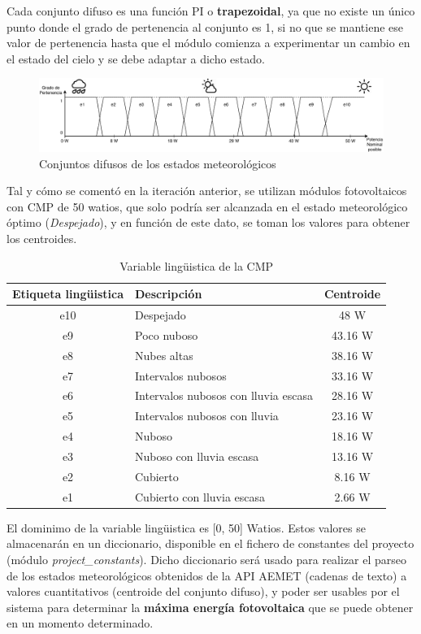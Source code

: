 Cada conjunto difuso es una función PI o \textbf{trapezoidal}, ya que no existe un único punto donde el grado de pertenencia al conjunto es 1, si no que se mantiene ese valor de pertenencia hasta que el módulo comienza a experimentar un cambio en el estado del cielo y se debe adaptar a dicho estado.

\begin{figure}[h]
	\centering
	\includegraphics[width=17cm]{figs/Fuzzy_diagram.pdf}
	\caption{Conjuntos difusos de los estados meteorológicos}
        \label{fig:fuzzySets}
\end{figure}

Tal y cómo se comentó en la iteración anterior, se utilizan módulos fotovoltaicos con \gls{CMP} de 50 watios, que solo podría ser alcanzada en el estado meteorológico óptimo (\textit{Despejado}), y en función de este dato, se toman los valores para obtener los centroides.
\begin{table}[H]
        \centering
        \begin{tabular}{|c|l|c|}
                \hline
                \textbf{Etiqueta lingüistica} & \textbf{Descripción} & \textbf{Centroide} \\ \hline
                e10 & Despejado & 48 W \\ \hline
                e9 & Poco nuboso & 43.16 W \\ \hline
                e8 & Nubes altas & 38.16 W \\ \hline
                e7 & Intervalos nubosos & 33.16 W \\ \hline
                e6 & Intervalos nubosos con lluvia escasa & 28.16 W \\ \hline
                e5 & Intervalos nubosos con lluvia & 23.16 W \\ \hline
                e4 & Nuboso & 18.16 W \\ \hline
                e3 & Nuboso con lluvia escasa & 13.16 W \\ \hline
                e2 & Cubierto & 8.16 W \\ \hline
                e1 & Cubierto con lluvia escasa & 2.66 W\\ \hline
        \end{tabular}
        \caption{Variable lingüistica de la CMP}
        \label{tab:estadosFavorables}
\end{table}

El dominimo de la variable lingüistica es [0, 50] Watios. Estos valores se almacenarán en un diccionario, disponible en el fichero de constantes del proyecto (módulo \textit{project\_constants}). Dicho diccionario será usado para realizar el parseo de los estados meteorológicos obtenidos de la \gls{API} \gls{AEMET} (cadenas de texto) a valores cuantitativos (centroide del conjunto difuso), y poder ser usables por el sistema para determinar la \textbf{máxima energía fotovoltaica} que se puede obtener en un momento determinado.
